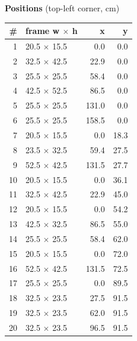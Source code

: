\documentclass[a4paper,landscape,10pt]{article}
\begin{document}
\begin{minipage}[t]{0.25\textwidth}
\vspace{8pt}
{\bfseries Positions} (top-left corner, cm)\\[2pt]
\tiny
\begin{tabular}{@{}r l r r@{}}
\toprule
\# & frame w $\times$ h & x & y \\
\midrule
1 & 20.5 $\times$ 15.5 & 0.0 & 0.0 \\
2 & 32.5 $\times$ 42.5 & 22.9 & 0.0 \\
3 & 25.5 $\times$ 25.5 & 58.4 & 0.0 \\
4 & 42.5 $\times$ 52.5 & 86.5 & 0.0 \\
5 & 25.5 $\times$ 25.5 & 131.0 & 0.0 \\
6 & 25.5 $\times$ 25.5 & 158.5 & 0.0 \\
7 & 20.5 $\times$ 15.5 & 0.0 & 18.3 \\
8 & 23.5 $\times$ 32.5 & 59.4 & 27.5 \\
9 & 52.5 $\times$ 42.5 & 131.5 & 27.7 \\
10 & 20.5 $\times$ 15.5 & 0.0 & 36.1 \\
11 & 32.5 $\times$ 42.5 & 22.9 & 45.0 \\
12 & 20.5 $\times$ 15.5 & 0.0 & 54.2 \\
13 & 42.5 $\times$ 32.5 & 86.5 & 55.0 \\
14 & 25.5 $\times$ 25.5 & 58.4 & 62.0 \\
15 & 20.5 $\times$ 15.5 & 0.0 & 72.0 \\
16 & 52.5 $\times$ 42.5 & 131.5 & 72.5 \\
17 & 25.5 $\times$ 25.5 & 0.0 & 89.5 \\
18 & 32.5 $\times$ 23.5 & 27.5 & 91.5 \\
19 & 32.5 $\times$ 23.5 & 62.0 & 91.5 \\
20 & 32.5 $\times$ 23.5 & 96.5 & 91.5 \\
\bottomrule
\end{tabular}
\end{minipage}
\clearpage
\end{document}
